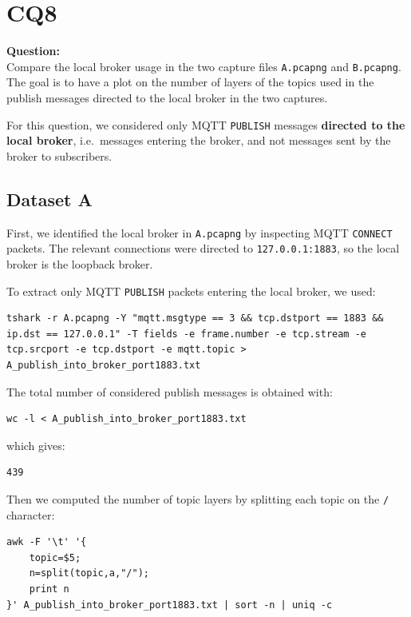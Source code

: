 \section{CQ8}

\begin{fancyquote}
    \textbf{Question:}\\
    Compare the local broker usage in the two capture files \texttt{A.pcapng} and \texttt{B.pcapng}. The goal is to have a plot on the number of layers of the topics used in the publish messages directed to the local broker in the two captures.
\end{fancyquote}

For this question, we considered only MQTT \texttt{PUBLISH} messages \textbf{directed to the local broker}, i.e.\ messages entering the broker, and not messages sent by the broker to subscribers.

\subsection*{Dataset A}

First, we identified the local broker in \texttt{A.pcapng} by inspecting MQTT \texttt{CONNECT} packets. The relevant connections were directed to \texttt{127.0.0.1:1883}, so the local broker is the loopback broker.

To extract only MQTT \texttt{PUBLISH} packets entering the local broker, we used:

\begin{lstlisting}
tshark -r A.pcapng -Y "mqtt.msgtype == 3 && tcp.dstport == 1883 && ip.dst == 127.0.0.1" -T fields -e frame.number -e tcp.stream -e tcp.srcport -e tcp.dstport -e mqtt.topic > A_publish_into_broker_port1883.txt
\end{lstlisting}

The total number of considered publish messages is obtained with:

\begin{lstlisting}
wc -l < A_publish_into_broker_port1883.txt
\end{lstlisting}

which gives:

\begin{verbatim}
439
\end{verbatim}

Then we computed the number of topic layers by splitting each topic on the \texttt{/} character:

\begin{lstlisting}
awk -F '\t' '{
    topic=$5;
    n=split(topic,a,"/");
    print n
}' A_publish_into_broker_port1883.txt | sort -n | uniq -c
\end{lstlisting}

